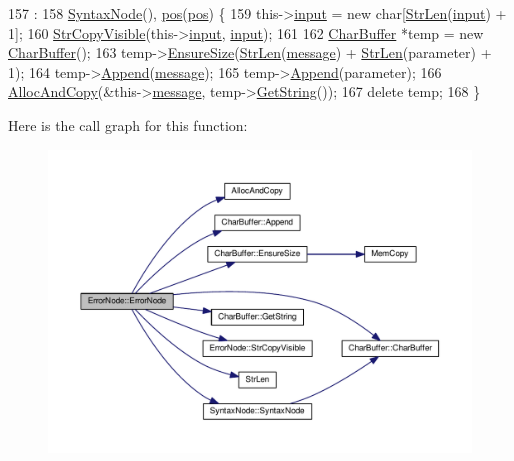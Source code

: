 \begin{DoxyCode}
157                                                                                            :
158     \hyperlink{classSyntaxNode_ac94372d402f38a118b4e8cd20ba7e520}{SyntaxNode}(), \hyperlink{classErrorNode_a2f9577d7885985f6a5671a14d64a75cf}{pos}(\hyperlink{classErrorNode_a2f9577d7885985f6a5671a14d64a75cf}{pos}) \{
159     this->\hyperlink{classErrorNode_ac2cc563162c10fff090113340184bb4b}{input} = \textcolor{keyword}{new} \textcolor{keywordtype}{char}[\hyperlink{clib_8h_a67ec56eb98b49515d35005a5b3bf9a32}{StrLen}(\hyperlink{classErrorNode_ac2cc563162c10fff090113340184bb4b}{input}) + 1];
160     \hyperlink{classErrorNode_a2e51822b04905fc867d13546af61abb8}{StrCopyVisible}(this->\hyperlink{classErrorNode_ac2cc563162c10fff090113340184bb4b}{input}, \hyperlink{classErrorNode_ac2cc563162c10fff090113340184bb4b}{input});
161 
162     \hyperlink{classCharBuffer}{CharBuffer} *temp = \textcolor{keyword}{new} \hyperlink{classCharBuffer}{CharBuffer}();
163     temp->\hyperlink{classCharBuffer_ad1907009b5ad136692b989fa96bf2f7e}{EnsureSize}(\hyperlink{clib_8h_a67ec56eb98b49515d35005a5b3bf9a32}{StrLen}(\hyperlink{classErrorNode_abd0f6fbd4876d013fbb7b6a9d5ce673e}{message}) + \hyperlink{clib_8h_a67ec56eb98b49515d35005a5b3bf9a32}{StrLen}(parameter) + 1);
164     temp->\hyperlink{classCharBuffer_a045b38735f7b3007c1b98d3d7b7feafe}{Append}(\hyperlink{classErrorNode_abd0f6fbd4876d013fbb7b6a9d5ce673e}{message});
165     temp->\hyperlink{classCharBuffer_a045b38735f7b3007c1b98d3d7b7feafe}{Append}(parameter);
166     \hyperlink{clib_8h_a5bed05c70cb17e541fee570b5dc32e1a}{AllocAndCopy}(&this->\hyperlink{classErrorNode_abd0f6fbd4876d013fbb7b6a9d5ce673e}{message}, temp->\hyperlink{classCharBuffer_a7dfd3feaaf80f318ba44efe15b1ec44b}{GetString}());
167     \textcolor{keyword}{delete} temp;
168 \}
\end{DoxyCode}


Here is the call graph for this function\+:\nopagebreak
\begin{figure}[H]
\begin{center}
\leavevmode
\includegraphics[width=350pt]{classErrorNode_a1c3d4afac02da7fcc0cec125a7ac03ba_cgraph}
\end{center}
\end{figure}




